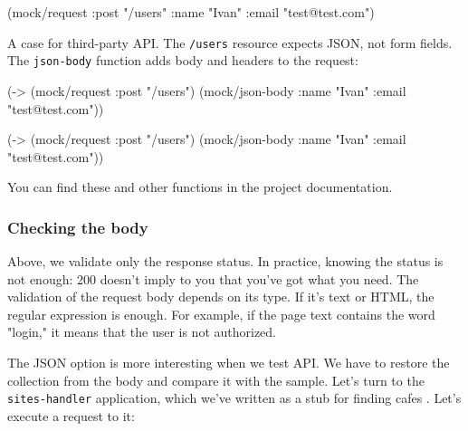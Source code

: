 \else

\begin{english}
  \begin{clojure}
(mock/request :post "/users"
              {:name "Ivan" :email "test@test.com"})
  \end{clojure}
\end{english}

\fi


\noindent
A case for third-party API. The \verb|/users| resource expects JSON, not form fields. The \verb|json-body| function adds body and headers to the request:

\ifx\DEVICETYPE\MOBILE

\begin{english}
  \begin{clojure}
(-> (mock/request :post "/users")
    (mock/json-body
      {:name "Ivan"
       :email "test@test.com"}))
  \end{clojure}
\end{english}

\else

\begin{english}
  \begin{clojure}
(-> (mock/request :post "/users")
    (mock/json-body {:name "Ivan" :email "test@test.com"}))
  \end{clojure}
\end{english}

\fi

\noindent
You can find these and other functions in the project documentation.

\subsubsection*{Checking the body}

Above, we validate only the response status. In practice, knowing the status is not enough: 200 doesn't imply to you that you've got what you need. The validation of the request body depends on its type. If it's text or HTML, the regular expression is enough. For example, if the page text contains the word "login," it means that the user is not authorized.


The JSON option is more interesting when we test API. We have to restore the collection from the body and compare it with the sample. Let's turn to the \verb|sites-handler| application, which we've written as a stub for finding cafes . Let's execute a request to it:

